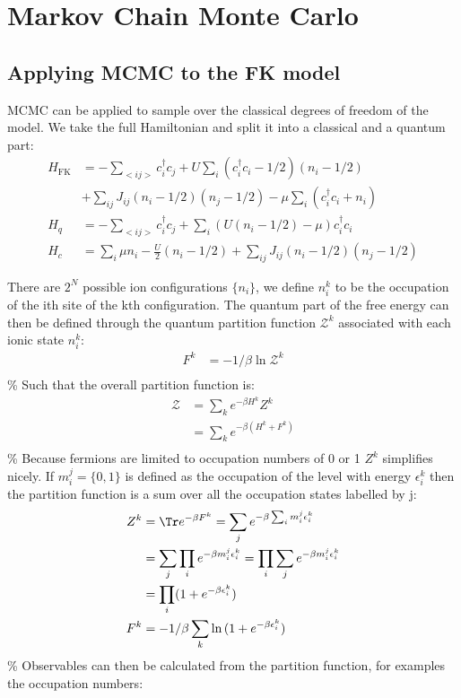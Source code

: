 \hypertarget{markov-chain-monte-carlo}{%
\section{Markov Chain Monte Carlo}\label{markov-chain-monte-carlo}}

\hypertarget{applying-mcmc-to-the-fk-model}{%
\subsection{Applying MCMC to the FK model}\label{applying-mcmc-to-the-fk-model}}

MCMC can be applied to sample over the classical degrees of freedom of the model. We take the full Hamiltonian and split it into a classical and a quantum part: \[\begin{aligned}
    H_{\mathrm{FK}} &= -\sum_{<ij>} c^\dagger_{i}c_{j} + U \sum_{i} (c^\dagger_{i}c_{i} - 1/2)( n_i - 1/2) \\
    &+ \sum_{ij} J_{ij} (n_i - 1/2) (n_j - 1/2)  - \mu \sum_i (c^\dagger_{i}c_{i} + n_i)\\
    H_q &= -\sum_{<ij>} c^\dagger_{i}c_{j} + \sum_{i} \left(U(n_i - 1/2) - \mu\right) c^\dagger_{i}c_{i}\\
    H_c &= \sum_i \mu n_i - \frac{U}{2}(n_i - 1/2) + \sum_{ij}J_{ij}(n_i - 1/2)(n_j - 1/2)
\end{aligned}
\]

There are \(2^N\) possible ion configurations \(\{ n_i \}\), we define \(n^k_i\) to be the occupation of the ith site of the kth configuration. The quantum part of the free energy can then be defined through the quantum partition function \(\mathcal{Z}^k\) associated with each ionic state \(n^k_i\): \[\begin{aligned}
F^k &= -1/\beta \ln{\mathcal{Z}^k} \\
\end{aligned}\] \% Such that the overall partition function is: \[\begin{aligned}
\mathcal{Z} &= \sum_k e^{- \beta H^k} Z^k \\
&= \sum_k e^{-\beta (H^k + F^k)} \\
\end{aligned}\] \% Because fermions are limited to occupation numbers of 0 or 1 \(Z^k\) simplifies nicely. If \(m^j_i = \{0,1\}\) is defined as the occupation of the level with energy \(\epsilon^k_i\) then the partition function is a sum over all the occupation states labelled by j: \[\begin{aligned}
Z^k    &= \Tr e^{-\beta F^k} = \sum_j e^{-\beta \sum_i m^j_i \epsilon^k_i}\\
       &= \sum_j \prod_i e^{- \beta m^j_i \epsilon^k_i}= \prod_i \sum_j e^{- \beta m^j_i \epsilon^k_i}\\
       &= \prod_i (1 + e^{- \beta \epsilon^k_i})\\
F^k    &= -1/\beta \sum_k \ln{(1 + e^{- \beta \epsilon^k_i})}
\end{aligned}\] \% Observables can then be calculated from the partition function, for examples the occupation numbers:

